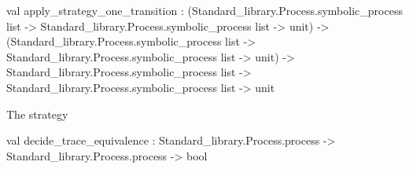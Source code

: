 \label{val:Algorithm.apply-underscorestrategy-underscoreone-underscoretransition}\begin{ocamldoccode}
val apply_strategy_one_transition :
  (Standard_library.Process.symbolic_process list ->
   Standard_library.Process.symbolic_process list -> unit) ->
  (Standard_library.Process.symbolic_process list ->
   Standard_library.Process.symbolic_process list -> unit) ->
  Standard_library.Process.symbolic_process list ->
  Standard_library.Process.symbolic_process list -> unit
\end{ocamldoccode}




The strategy



\label{val:Algorithm.decide-underscoretrace-underscoreequivalence}\begin{ocamldoccode}
val decide_trace_equivalence :
  Standard_library.Process.process -> Standard_library.Process.process -> bool
\end{ocamldoccode}


